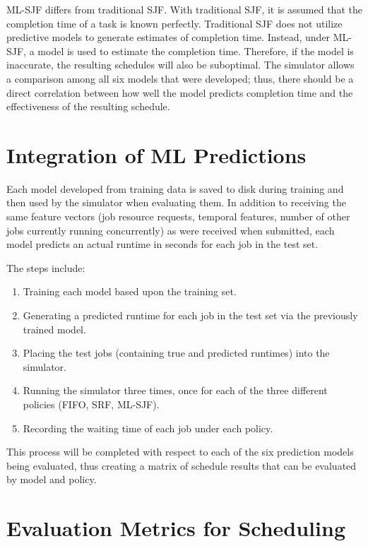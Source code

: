 ML-SJF differs from traditional SJF. With traditional SJF, it is assumed that the completion time of a task is known perfectly. Traditional SJF does not utilize predictive models to generate estimates of completion time. Instead, under ML-SJF, a model is used to estimate the completion time. Therefore, if the model is inaccurate, the resulting schedules will also be suboptimal. The simulator allows a comparison among all six models that were developed; thus, there should be a direct correlation between how well the model predicts completion time and the effectiveness of the resulting schedule.

\section{Integration of ML Predictions}
\label{sec:predintegration}

Each model developed from training data is saved to disk during training and then used by the simulator when evaluating them. In addition to receiving the same feature vectors (job resource requests, temporal features, number of other jobs currently running concurrently) as were received when submitted, each model predicts an actual runtime in seconds for each job in the test set.

The steps include:
\begin{enumerate}
    \item Training each model based upon the training set.
    \item Generating a predicted runtime for each job in the test set via the previously trained model.
    \item Placing the test jobs (containing true and predicted runtimes) into the simulator.
    \item Running the simulator three times, once for each of the three different policies (FIFO, SRF, ML-SJF).
    \item Recording the waiting time of each job under each policy.
\end{enumerate}

This process will be completed with respect to each of the six prediction models being evaluated, thus creating a matrix of schedule results that can be evaluated by model and policy.

\section{Evaluation Metrics for Scheduling}

